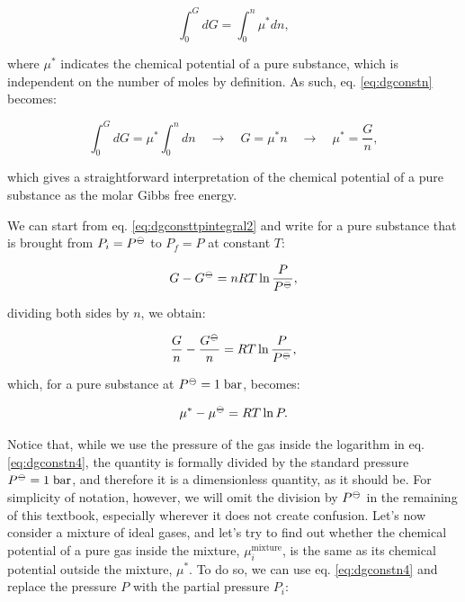 \documentclass[
  9pt,
]{extbook}
\theoremstyle{definition}
\theoremstyle{definition}
\theoremstyle{definition}
\theoremstyle{definition}
\theoremstyle{remark}
\begin{document}
\begin{equation}
\int_0^G d G = \int_0^n \mu^* dn,
\label{eq:dgconstn}
\end{equation}

where \(\mu^*\) indicates the chemical potential of a pure substance, which is independent on the number of moles by definition. As such, eq. \eqref{eq:dgconstn} becomes:

\begin{equation}
\int_0^G d G = \mu^* \int_0^n dn \quad \rightarrow \quad G = \mu^* n \quad \rightarrow \quad \mu^* = \frac{G}{n},
\label{eq:dgconstn1}
\end{equation}

which gives a straightforward interpretation of the chemical potential of a pure substance as the molar Gibbs free energy.

We can start from eq. \eqref{eq:dgconsttpintegral2} and write for a pure substance that is brought from \(P_i=P^{-\kern-6pt{\ominus}\kern-6pt-}\) to \(P_f=P\) at constant \(T\):

\begin{equation}
G - G^{-\kern-6pt{\ominus}\kern-6pt-}= nRT \ln \frac{P}{P^{-\kern-6pt{\ominus}\kern-6pt-}},
\label{eq:dgconstn2}
\end{equation}

dividing both sides by \(n\), we obtain:

\begin{equation}
\frac{G}{n} - \frac{G^{-\kern-6pt{\ominus}\kern-6pt-}}{n} = RT \ln \frac{P}{P^{-\kern-6pt{\ominus}\kern-6pt-}},
\label{eq:dgconstn3}
\end{equation}

which, for a pure substance at \(P^{-\kern-6pt{\ominus}\kern-6pt-}= 1 \;\text{bar}\), becomes:

\begin{equation}
\mu^* - \mu^{-\kern-6pt{\ominus}\kern-6pt-}=      RT \ln P.
\label{eq:dgconstn4}
\end{equation}

Notice that, while we use the pressure of the gas inside the logarithm in eq. \eqref{eq:dgconstn4}, the quantity is formally divided by the standard pressure \(P^{-\kern-6pt{\ominus}\kern-6pt-}= 1 \;\text{bar}\), and therefore it is a dimensionless quantity, as it should be. For simplicity of notation, however, we will omit the division by \(P^{-\kern-6pt{\ominus}\kern-6pt-}\) in the remaining of this textbook, especially wherever it does not create confusion.
Let's now consider a mixture of ideal gases, and let's try to find out whether the chemical potential of a pure gas inside the mixture, \(\mu_i^{\text{mixture}}\), is the same as its chemical potential outside the mixture, \(\mu^*\).
To do so, we can use eq. \eqref{eq:dgconstn4} and replace the pressure \(P\) with the partial pressure \(P_i\):
\end{document}

